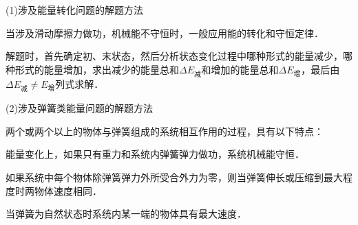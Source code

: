 (1)涉及能量转化问题的解题方法

当涉及滑动摩擦力做功，机械能不守恒时，一般应用能的转化和守恒定律．

解题时，首先确定初、末状态，然后分析状态变化过程中哪种形式的能量减少，哪种形式的能量增加，求出减少的能量总和$\Delta E_{\text{减}}$和增加的能量总和$\Delta E_{\text{增}}$，最后由$\Delta E_{\text{减}}\neq E_{\text{增}}$列式求解．

(2)涉及弹簧类能量问题的解题方法

两个或两个以上的物体与弹簧组成的系统相互作用的过程，具有以下特点：

能量变化上，如果只有重力和系统内弹簧弹力做功，系统机械能守恒．

如果系统中每个物体除弹簧弹力外所受合外力为零，则当弹簧伸长或压缩到最大程度时两物体速度相同．

当弹簧为自然状态时系统内某一端的物体具有最大速度．

